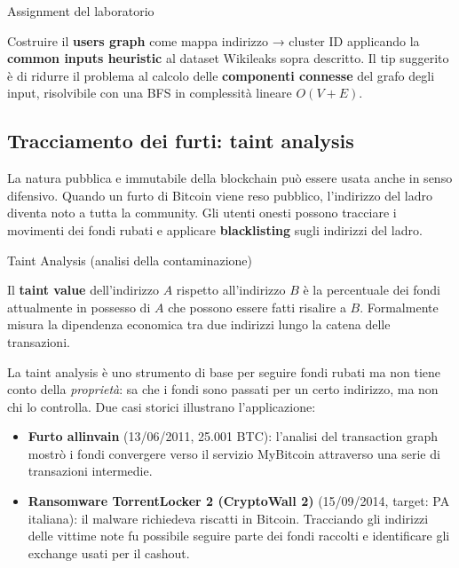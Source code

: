 \documentclass[
  italian,
  openany]{book}
\providecommand{\tightlist}{%
  \setlength{\itemsep}{0pt}\setlength{\parskip}{0pt}}
\begin{document}
\begin{calloutnote}{Assignment del laboratorio}

Costruire il \textbf{users graph} come mappa indirizzo → cluster ID
applicando la \textbf{common inputs heuristic} al dataset Wikileaks
sopra descritto. Il tip suggerito è di ridurre il problema al calcolo
delle \textbf{componenti connesse} del grafo degli input, risolvibile
con una BFS in complessità lineare \(O(V + E)\).

\end{calloutnote}

\subsection{Tracciamento dei furti: taint
analysis}\label{tracciamento-dei-furti-taint-analysis}

La natura pubblica e immutabile della blockchain può essere usata anche
in senso difensivo. Quando un furto di Bitcoin viene reso pubblico,
l'indirizzo del ladro diventa noto a tutta la community. Gli utenti
onesti possono tracciare i movimenti dei fondi rubati e applicare
\textbf{blacklisting} sugli indirizzi del ladro.

\begin{calloutdefinition}{Taint Analysis (analisi della contaminazione)}

Il \textbf{taint value} dell'indirizzo \(A\) rispetto all'indirizzo
\(B\) è la percentuale dei fondi attualmente in possesso di \(A\) che
possono essere fatti risalire a \(B\). Formalmente misura la dipendenza
economica tra due indirizzi lungo la catena delle transazioni.

\end{calloutdefinition}

La taint analysis è uno strumento di base per seguire fondi rubati ma
non tiene conto della \emph{proprietà}: sa che i fondi sono passati per
un certo indirizzo, ma non chi lo controlla. Due casi storici illustrano
l'applicazione:

\begin{itemize}
\tightlist
\item
  \textbf{Furto allinvain} (13/06/2011, 25.001 BTC): l'analisi del
  transaction graph mostrò i fondi convergere verso il servizio
  MyBitcoin attraverso una serie di transazioni intermedie.
\item
  \textbf{Ransomware TorrentLocker 2 (CryptoWall 2)} (15/09/2014,
  target: PA italiana): il malware richiedeva riscatti in Bitcoin.
  Tracciando gli indirizzi delle vittime note fu possibile seguire parte
  dei fondi raccolti e identificare gli exchange usati per il cashout.
\end{itemize}
\end{document}
